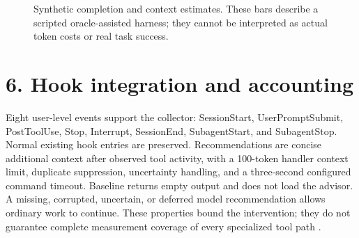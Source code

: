 \documentclass[11pt]{article}
\begin{document}
\begin{figure}[htbp]
\centering
\begin{minipage}{0.48\linewidth}\centering{}\end{minipage}\hfill\begin{minipage}{0.48\linewidth}\centering{}\end{minipage}
\caption{Synthetic completion and context estimates. These bars describe a scripted oracle-assisted harness; they cannot be interpreted as actual token costs or real task success.}
\end{figure}
\section*{6. Hook integration and accounting}
Eight user-level events support the collector: SessionStart, UserPromptSubmit, PostToolUse, Stop, Interrupt, SessionEnd, SubagentStart, and SubagentStop. Normal existing hook entries are preserved. Recommendations are concise additional context after observed tool activity, with a 100-token handler context limit, duplicate suppression, uncertainty handling, and a three-second configured command timeout. Baseline returns empty output and does not load the advisor. A missing, corrupted, uncertain, or deferred model recommendation allows ordinary work to continue. These properties bound the intervention; they do not guarantee complete measurement coverage of every specialized tool path \cite{r7}.
\end{document}
